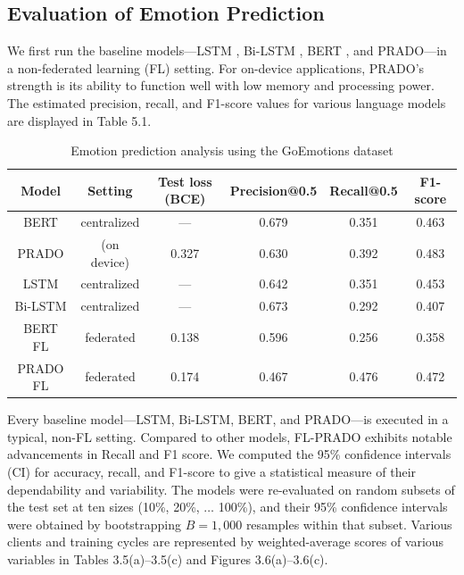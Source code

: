 \subsection{Evaluation of Emotion Prediction}
We first run the baseline models---LSTM \cite{ref84}, Bi-LSTM \cite{ref85} , BERT\cite{ref67} , and PRADO---in a non-federated learning (FL) setting. For on-device applications, PRADO's strength is its ability to function well with low memory and processing power. The estimated precision, recall, and F1-score values for various language models are displayed in Table 5.1.

\begin{table}[htbp]
  \centering
  \caption{Emotion prediction analysis using the GoEmotions dataset}
  \label{tab:ch3_t4}
  \begin{tabular}{|c|c|c|c|c|c|}
    \hline
    Model & Setting & Test loss (BCE) & Precision@0.5 & Recall@0.5 & F1-score \\
    \hline
    BERT & centralized & --- & 0.679 & 0.351 & 0.463 \\
    \hline
    PRADO & (on device) & 0.327 & 0.630 & 0.392 & 0.483 \\
    \hline
    LSTM & centralized & --- & 0.642 & 0.351 & 0.453 \\
    \hline
    Bi-LSTM & centralized & --- & 0.673 & 0.292 & 0.407 \\
    \hline
    BERT FL & federated & 0.138 & 0.596 & 0.256 & 0.358 \\
    \hline
    PRADO FL & federated & 0.174 & 0.467 & 0.476 & 0.472 \\
    \hline
  \end{tabular}
\end{table}

Every baseline model---LSTM, Bi-LSTM, BERT, and PRADO---is executed in a typical, non-FL setting. Compared to other models, FL-PRADO exhibits notable advancements in Recall and F1 score. We computed the 95\% confidence intervals (CI) for accuracy, recall, and F1-score to give a statistical measure of their dependability and variability. The models were re-evaluated on random subsets of the test set at ten sizes (10\%, 20\%, $\ldots$ 100\%), and their 95\% confidence intervals were obtained by bootstrapping $B = 1{,}000$ resamples within that subset.  Various clients and training cycles are represented by weighted-average scores of various variables in Tables 3.5(a)--3.5(c) and Figures 3.6(a)--3.6(c).

